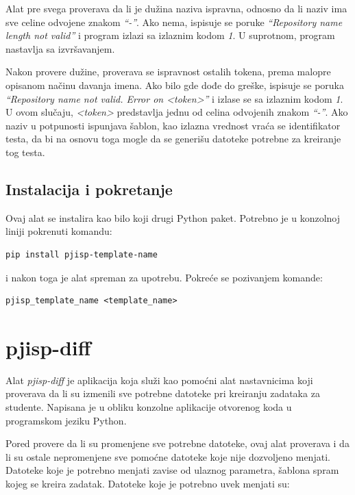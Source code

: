 \documentclass[12pt]{report}
\begin{document}
Alat pre svega proverava da li je dužina naziva ispravna, odnosno da li naziv ima sve celine odvojene znakom \textit{``-''}. Ako nema, ispisuje se poruke \textit{``Repository name length not valid''} i program izlazi sa izlaznim kodom \textit{1}. U suprotnom, program nastavlja sa izvršavanjem.

Nakon provere dužine, proverava se ispravnost ostalih tokena, prema malopre opisanom načinu davanja imena. Ako bilo gde dođe do greške, ispisuje se poruka  \textit{``Repository name not valid. Error on <token>''} i izlase se sa izlaznim kodom \textit{1}. U ovom slučaju, \textit{<token>} predstavlja jednu od celina odvojenih znakom \textit{``-''}. Ako naziv u potpunosti ispunjava šablon, kao izlazna vrednost vraća se identifikator testa, da bi na osnovu toga mogle da se generišu datoteke potrebne za kreiranje tog testa.

\subsection{Instalacija i pokretanje}
Ovaj alat se instalira kao bilo koji drugi Python paket. Potrebno je u konzolnoj liniji pokrenuti komandu:

\begin{verbatim}
pip install pjisp-template-name
\end{verbatim}

i nakon toga je alat spreman za upotrebu. Pokreće se pozivanjem komande:

\begin{verbatim}
pjisp_template_name <template_name>
\end{verbatim}

\section{pjisp-diff}

Alat \textit{pjisp-diff} \cite{pjisp-diff} je aplikacija koja služi kao pomoćni alat nastavnicima koji proverava da li su izmenili sve potrebne datoteke pri kreiranju zadataka za studente. Napisana je u obliku konzolne aplikacije otvorenog koda u programskom jeziku Python.

Pored provere da li su promenjene sve potrebne datoteke, ovaj alat proverava i da li su ostale nepromenjene sve pomoćne datoteke koje nije dozvoljeno menjati. Datoteke koje je potrebno menjati zavise od ulaznog parametra, šablona spram kojeg se kreira zadatak. Datoteke koje je potrebno uvek menjati su:
\end{document}
